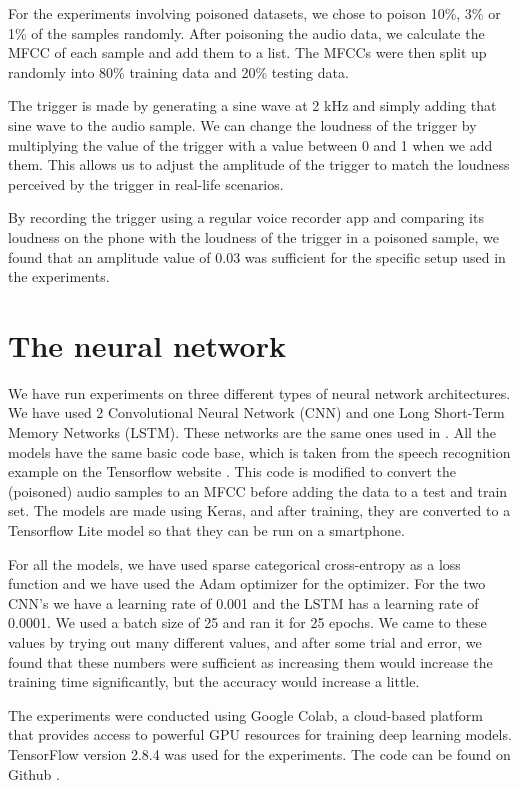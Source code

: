 \documentclass{report}
\theoremstyle{definition}
\theoremstyle{remark}
\begin{document}
For the experiments involving poisoned datasets, we chose to poison 10\%, 3\% or 1\% of the samples randomly. After poisoning the audio data, we calculate the MFCC of each sample and add them to a list. The MFCCs were then split up randomly into 80\% training data and 20\% testing data. 

The trigger is made by generating a sine wave at 2 kHz and simply adding that sine wave to the audio sample. We can change the loudness of the trigger by multiplying the value of the trigger with a value between 0 and 1 when we add them. This allows us to adjust the amplitude of the trigger to match the loudness perceived by the trigger in real-life scenarios. 

By recording the trigger using a regular voice recorder app and comparing its loudness on the phone with the loudness of the trigger in a poisoned sample, we found that an amplitude value of 0.03 was sufficient for the specific setup used in the experiments.

\section{The neural network}
We have run experiments on three different types of neural network architectures. We have used 2 Convolutional Neural Network (CNN) and one Long Short-Term Memory Networks (LSTM). These networks are the same ones used in \cite{CYHI}. All the models have the same basic code base, which is taken from the speech recognition example on the Tensorflow website \cite{TenserflowExample}. This code is modified to convert the (poisoned) audio samples to an MFCC before adding the data to a test and train set. The models are made using Keras, and after training, they are converted to a Tensorflow Lite model so that they can be run on a smartphone. 

For all the models, we have used sparse categorical cross-entropy as a loss function and we have used the Adam optimizer for the optimizer. For the two CNN's we have a learning rate of 0.001 and the LSTM has a learning rate of 0.0001. We used a batch size of 25 and ran it for 25 epochs. We came to these values by trying out many different values, and after some trial and error, we found that these numbers were sufficient as increasing them would increase the training time significantly, but the accuracy would increase a little.

The experiments were conducted using Google Colab, a cloud-based platform that provides access to powerful GPU resources for training deep learning models. TensorFlow version 2.8.4 was used for the experiments. The code can be found on Github \cite{GH}.
\end{document}
